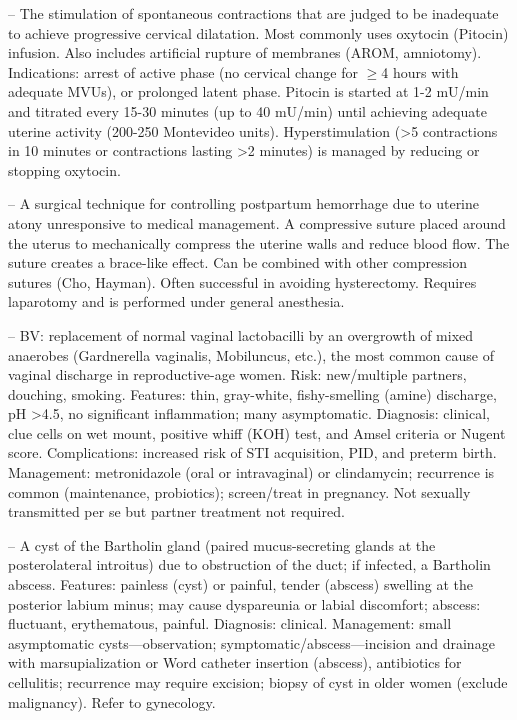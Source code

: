 -- The stimulation of spontaneous contractions that are judged to be inadequate to achieve progressive cervical dilatation. Most commonly uses oxytocin (Pitocin) infusion. Also includes artificial rupture of membranes (AROM, amniotomy). Indications: arrest of active phase (no cervical change for \(\ge\)4 hours with adequate MVUs), or prolonged latent phase. Pitocin is started at 1-2 mU/min and titrated every 15-30 minutes (up to 40 mU/min) until achieving adequate uterine activity (200-250 Montevideo units). Hyperstimulation (>5 contractions in 10 minutes or contractions lasting >2 minutes) is managed by reducing or stopping oxytocin.

-- A surgical technique for controlling postpartum hemorrhage due to uterine atony unresponsive to medical management. A compressive suture placed around the uterus to mechanically compress the uterine walls and reduce blood flow. The suture creates a brace-like effect. Can be combined with other compression sutures (Cho, Hayman). Often successful in avoiding hysterectomy. Requires laparotomy and is performed under general anesthesia.

-- BV: replacement of normal vaginal lactobacilli by an overgrowth of mixed anaerobes (Gardnerella vaginalis, Mobiluncus, etc.), the most common cause of vaginal discharge in reproductive-age women. Risk: new/multiple partners, douching, smoking. Features: thin, gray-white, fishy-smelling (amine) discharge, pH >4.5, no significant inflammation; many asymptomatic. Diagnosis: clinical, clue cells on wet mount, positive whiff (KOH) test, and Amsel criteria or Nugent score. Complications: increased risk of STI acquisition, PID, and preterm birth. Management: metronidazole (oral or intravaginal) or clindamycin; recurrence is common (maintenance, probiotics); screen/treat in pregnancy. Not sexually transmitted per se but partner treatment not required.

-- A cyst of the Bartholin gland (paired mucus-secreting glands at the posterolateral introitus) due to obstruction of the duct; if infected, a Bartholin abscess. Features: painless (cyst) or painful, tender (abscess) swelling at the posterior labium minus; may cause dyspareunia or labial discomfort; abscess: fluctuant, erythematous, painful. Diagnosis: clinical. Management: small asymptomatic cysts—observation; symptomatic/abscess—incision and drainage with marsupialization or Word catheter insertion (abscess), antibiotics for cellulitis; recurrence may require excision; biopsy of cyst in older women (exclude malignancy). Refer to gynecology.

